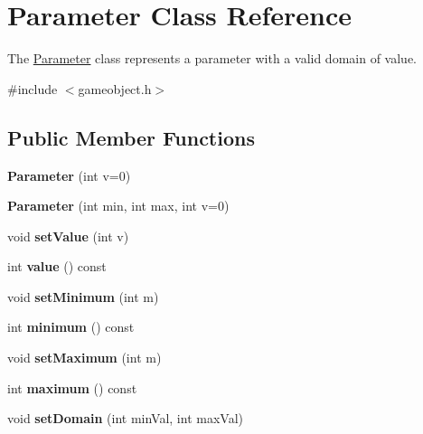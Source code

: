 \hypertarget{class_parameter}{\section{\-Parameter \-Class \-Reference}
\label{class_parameter}
}


\-The \hyperlink{class_parameter}{\-Parameter} class represents a parameter with a valid domain of value.  




{\ttfamily \#include $<$gameobject.\-h$>$}

\subsection*{\-Public \-Member \-Functions}
\begin{DoxyCompactItemize}
\item 
\hypertarget{class_parameter_aa6c9e61f1bb69049360de0d3eb87a365}{{\bfseries \-Parameter} (int v=0)}\label{class_parameter_aa6c9e61f1bb69049360de0d3eb87a365}

\item 
\hypertarget{class_parameter_a161c8aa0045e72afea7fe3bc3c1882c4}{{\bfseries \-Parameter} (int min, int max, int v=0)}\label{class_parameter_a161c8aa0045e72afea7fe3bc3c1882c4}

\item 
\hypertarget{class_parameter_a5f4ec5f133fc90d0b20e83a063f5eb5c}{void {\bfseries set\-Value} (int v)}\label{class_parameter_a5f4ec5f133fc90d0b20e83a063f5eb5c}

\item 
\hypertarget{class_parameter_a971c0369e19300bf5f38124964203a65}{int {\bfseries value} () const }\label{class_parameter_a971c0369e19300bf5f38124964203a65}

\item 
\hypertarget{class_parameter_a8618a13484e3a4c6ef36cabe85bb6c23}{void {\bfseries set\-Minimum} (int m)}\label{class_parameter_a8618a13484e3a4c6ef36cabe85bb6c23}

\item 
\hypertarget{class_parameter_a181c5a830f3ee9c5a08eb62f7f678212}{int {\bfseries minimum} () const }\label{class_parameter_a181c5a830f3ee9c5a08eb62f7f678212}

\item 
\hypertarget{class_parameter_ac5566dd445d208c138fc3f4510866959}{void {\bfseries set\-Maximum} (int m)}\label{class_parameter_ac5566dd445d208c138fc3f4510866959}

\item 
\hypertarget{class_parameter_afad0d040faf31c5faeaf63cd5cf048c8}{int {\bfseries maximum} () const }\label{class_parameter_afad0d040faf31c5faeaf63cd5cf048c8}

\item 
\hypertarget{class_parameter_a0a239a5f6f32ca67ef601730f5aa2e6d}{void {\bfseries set\-Domain} (int min\-Val, int max\-Val)}\label{class_parameter_a0a239a5f6f32ca67ef601730f5aa2e6d}

\end{DoxyCompactItemize}


